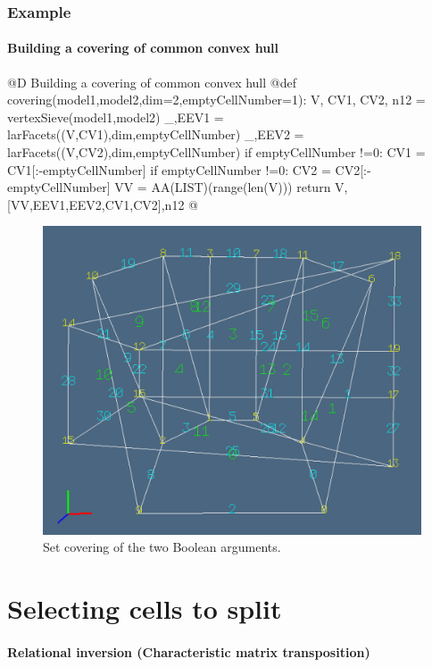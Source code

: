 \documentclass[11pt,oneside]{article}	%
\begin{document}
\subsubsection{Example}

\paragraph{Building a covering of common convex hull}

@D Building a covering of common convex hull
@{def covering(model1,model2,dim=2,emptyCellNumber=1):
	V, CV1, CV2, n12 = vertexSieve(model1,model2)
	_,EEV1 = larFacets((V,CV1),dim,emptyCellNumber)
	_,EEV2 = larFacets((V,CV2),dim,emptyCellNumber)
	if emptyCellNumber !=0: CV1 = CV1[:-emptyCellNumber]
	if emptyCellNumber !=0: CV2 = CV2[:-emptyCellNumber]
	VV = AA(LIST)(range(len(V)))
	return V,[VV,EEV1,EEV2,CV1,CV2],n12
@}

\begin{figure}[htbp] %
   \centering
   \includegraphics[width=0.6\linewidth]{images/covering} 
   \caption{Set covering of the two Boolean arguments.}
   \label{fig:example}
\end{figure}




\section{Selecting cells to split}


\paragraph{Relational inversion (Characteristic matrix transposition)}
\end{document}
